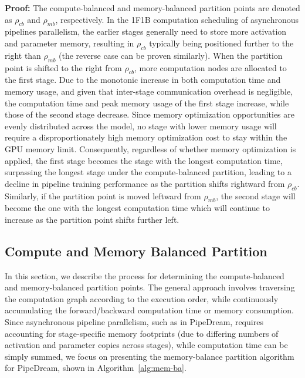 \textbf{Proof:} The compute-balanced and memory-balanced
partition points are denoted as $\rho_{cb}$ and $\rho_{mb}$, respectively.
In the 1F1B computation scheduling of asynchronous pipelines parallelism,
the earlier stages generally need to store more activation and parameter memory,
resulting in $\rho_{cb}$ typically being positioned further to the right than $\rho_{mb}$
(the reverse case can be proven similarly).
When the partition point is shifted to the right from $\rho_{cb}$,
more computation nodes are allocated to the first stage.
Due to the monotonic increase in both computation time and memory usage,
and given that inter-stage communication overhead is negligible,
the computation time and peak memory usage of the first stage increase,
while those of the second stage decrease.
Since memory optimization opportunities are evenly distributed across the model,
no stage with lower memory usage will require a disproportionately
high memory optimization cost to stay within the GPU memory limit.
Consequently, regardless of whether memory optimization is applied,
the first stage becomes the stage with the longest computation time,
surpassing the longest stage under the compute-balanced partition,
leading to a decline in pipeline training performance as the partition shifts rightward from $\rho_{cb}$.
Similarly, if the partition point is moved leftward from $\rho_{mb}$,
the second stage will become the one with the longest computation time
 which will continue to increase as the partition point shifts further left.

\subsection{Compute and Memory Balanced Partition}
In this section, we describe the process for determining the compute-balanced and memory-balanced partition points.
The general approach involves traversing the computation graph according to the execution order,
while continuously accumulating the forward/backward computation time or memory consumption.
Since asynchronous pipeline parallelism, such as in PipeDream,
requires accounting for stage-specific memory footprints
(due to differing numbers of activation and parameter copies across stages),
while computation time can be simply summed,
we focus on presenting the memory-balance partition algorithm for PipeDream, shown in Algorithm~\ref{alg:mem-ba}.

